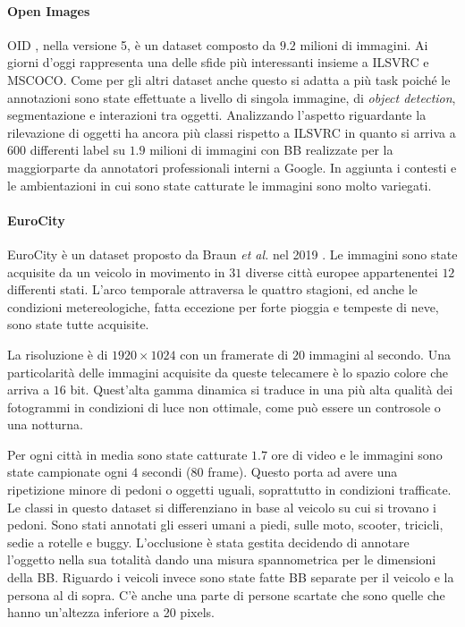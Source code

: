 \paragraph{Open Images} 
\ac{OID} \cite{krasin2017openimages}, nella versione 5, è un dataset composto da $9.2$ milioni di immagini. Ai giorni d'oggi rappresenta una delle sfide più interessanti insieme a \ac{ILSVRC} e \ac{MSCOCO}. Come per gli altri dataset anche questo si adatta a più task poiché le annotazioni sono state effettuate a livello di singola immagine, di \textit{object detection}, segmentazione e interazioni tra oggetti. 
Analizzando l'aspetto riguardante la rilevazione di oggetti ha ancora più classi rispetto a \ac{ILSVRC} in quanto si arriva a $600$ differenti label su $1.9$ milioni di immagini con \ac{BB} realizzate per la maggiorparte da annotatori professionali interni a Google. In aggiunta i contesti e le ambientazioni in cui sono state catturate le immagini sono molto variegati.
\paragraph{EuroCity}  EuroCity è un dataset proposto da Braun \textit{et al. } nel 2019 \cite{braun2018eurocity}. Le immagini sono state acquisite da un veicolo in movimento in $31$ diverse città europee appartenentei $12$ differenti stati. L'arco temporale attraversa le quattro stagioni, ed anche le condizioni metereologiche, fatta eccezione per forte pioggia e tempeste di neve, sono state tutte acquisite. 

La risoluzione è di $1920 \times 1024$ con un framerate di $20$ immagini al secondo. Una particolarità delle immagini acquisite da queste telecamere è lo spazio colore che arriva a $16$ bit. Quest'alta gamma dinamica si traduce in una più alta qualità dei fotogrammi in condizioni di luce non ottimale, come può essere un controsole o una notturna. 

Per ogni città in media sono state catturate $1.7$ ore di video e le immagini sono state campionate ogni $4$ secondi ($80$ frame). Questo porta ad avere una ripetizione minore di pedoni o oggetti uguali, soprattutto in condizioni trafficate.
Le classi in questo dataset si differenziano in base al veicolo su cui si trovano i pedoni. Sono stati annotati gli esseri umani a piedi, sulle moto, scooter, tricicli, sedie a rotelle e buggy. 
L'occlusione è stata gestita decidendo di annotare l'oggetto nella sua totalità dando una misura spannometrica per le dimensioni della \ac{BB}. 
Riguardo i veicoli invece sono state fatte \ac{BB} separate per il veicolo e la persona al di sopra. 
C'è anche una parte di persone scartate che sono quelle che hanno un'altezza inferiore a 20 pixels. 

